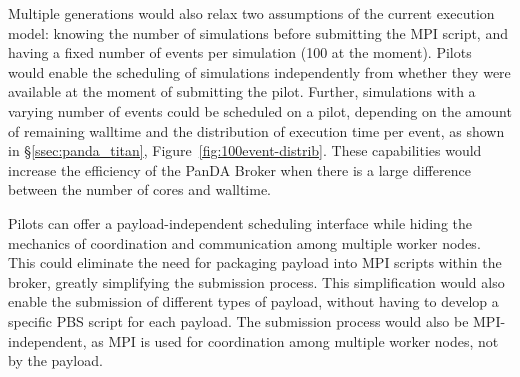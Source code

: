  Multiple
generations would also relax two assumptions of the current execution model:
knowing the number of simulations before submitting the MPI script, and having
a fixed number of events per simulation (100 at the moment). Pilots would
enable the scheduling of simulations independently from whether they were
available at the moment of submitting the pilot. Further, simulations with a
varying number of events could be scheduled on a pilot, depending on the
amount of remaining walltime and the distribution of execution time per event,
as shown in \S\ref{ssec:panda_titan}, Figure~\ref{fig:100event-distrib}.
These capabilities would increase the efficiency of the PanDA Broker when
there is a large difference between the number of cores and walltime.



Pilots can offer a payload-independent scheduling interface while hiding the
mechanics of coordination and communication among multiple worker nodes. This
could eliminate the need for packaging payload into MPI scripts within the
broker, greatly simplifying the submission process. This simplification would
also enable the submission of different types of payload, without having to
develop a specific PBS script for each payload. The submission process would
also be MPI-independent, as MPI is used for coordination among multiple worker
nodes, not by the payload. 
 

